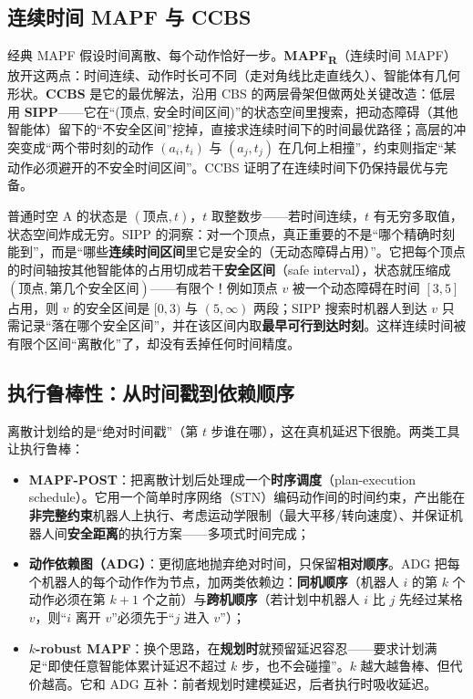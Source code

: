 \subsection{连续时间 MAPF 与 CCBS}
\label{sec:mapf-ccbs}

经典 MAPF 假设时间离散、每个动作恰好一步。\textbf{MAPF\textsubscript{R}}（连续时间 MAPF）放开这两点：时间连续、动作时长可不同（走对角线比走直线久）、智能体有几何形状。\textbf{CCBS} 是它的最优解法，沿用 CBS 的两层骨架但做两处关键改造\cite{andreychuk2022ccbs}：低层用 \textbf{SIPP}——它在“(顶点, 安全时间区间)”的状态空间里搜索，把动态障碍（其他智能体）留下的“不安全区间”挖掉，直接求连续时间下的时间最优路径；高层的冲突变成“两个带时刻的动作 $(a_i,t_i)$ 与 $(a_j,t_j)$ 在几何上相撞”，约束则指定“某动作必须避开的不安全时间区间”。CCBS 证明了在连续时间下仍保持最优与完备。

\begin{insight}
普通时空 A\* 的状态是 $(\text{顶点}, t)$，$t$ 取整数步——若时间连续，$t$ 有无穷多取值，状态空间炸成无穷。SIPP 的洞察：对一个顶点，真正重要的不是“哪个精确时刻能到”，而是“哪些\textbf{连续时间区间}里它是安全的（无动态障碍占用）”\cite{phillips2011sipp}。它把每个顶点的时间轴按其他智能体的占用切成若干\textbf{安全区间}（safe interval），状态就压缩成 $(\text{顶点}, \text{第几个安全区间})$——有限个！例如顶点 $v$ 被一个动态障碍在时间 $[3,5]$ 占用，则 $v$ 的安全区间是 $[0,3)$ 与 $(5,\infty)$ 两段；SIPP 搜索时机器人到达 $v$ 只需记录“落在哪个安全区间”，并在该区间内取\textbf{最早可行到达时刻}。这样连续时间被有限个区间“离散化”了，却没有丢掉任何时间精度。
\end{insight}

\subsection{执行鲁棒性：从时间戳到依赖顺序}
\label{sec:mapf-adg}

离散计划给的是“绝对时间戳”（第 $t$ 步谁在哪），这在真机延迟下很脆。两类工具让执行鲁棒：

\begin{itemize}
  \item \textbf{MAPF-POST}\cite{honig2016mapfpost}：把离散计划后处理成一个\textbf{时序调度}（plan-execution schedule）。它用一个简单时序网络（STN）编码动作间的时间约束，产出能在\textbf{非完整约束}机器人上执行、考虑运动学限制（最大平移/转向速度）、并保证机器人间\textbf{安全距离}的执行方案——多项式时间完成；
  \item \textbf{动作依赖图（ADG）}\cite{honig2019persistent}：更彻底地抛弃绝对时间，只保留\textbf{相对顺序}。ADG 把每个机器人的每个动作作为节点，加两类依赖边：\textbf{同机顺序}（机器人 $i$ 的第 $k$ 个动作必须在第 $k{+}1$ 个之前）与\textbf{跨机顺序}（若计划中机器人 $i$ 比 $j$ 先经过某格 $v$，则“$i$ 离开 $v$”必须先于“$j$ 进入 $v$”）；
  \item \textbf{$k$-robust MAPF}\cite{atzmon2018krobust}：换个思路，在\textbf{规划时}就预留延迟容忍——要求计划满足“即使任意智能体累计延迟不超过 $k$ 步，也不会碰撞”。$k$ 越大越鲁棒、但代价越高。它和 ADG 互补：前者规划时建模延迟，后者执行时吸收延迟。
\end{itemize}

